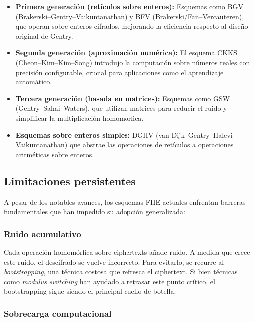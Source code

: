\documentclass[11pt]{article}
\theoremstyle{plain}
\begin{document}
\begin{itemize}
    \item \textbf{Primera generación (retículos sobre enteros):} Esquemas como BGV (Brakerski–Gentry–Vaikuntanathan) y BFV (Brakerski/Fan–Vercauteren), que operan sobre enteros cifrados, mejorando la eficiencia respecto al diseño original de Gentry.
    
    \item \textbf{Segunda generación (aproximación numérica):} El esquema CKKS (Cheon–Kim–Kim–Song) introdujo la computación sobre números reales con precisión configurable, crucial para aplicaciones como el aprendizaje automático.

    \item \textbf{Tercera generación (basada en matrices):} Esquemas como GSW (Gentry–Sahai–Waters), que utilizan matrices para reducir el ruido y simplificar la multiplicación homomórfica.

    \item \textbf{Esquemas sobre enteros simples:} DGHV (van Dijk–Gentry–Halevi–Vaikuntanathan) que abstrae las operaciones de retículos a operaciones aritméticas sobre enteros.
\end{itemize}

\subsection{Limitaciones persistentes}

A pesar de los notables avances, los esquemas FHE actuales enfrentan barreras fundamentales que han impedido su adopción generalizada:

\subsubsection{Ruido acumulativo}

Cada operación homomórfica sobre ciphertexts añade ruido. A medida que crece este ruido, el descifrado se vuelve incorrecto. Para evitarlo, se recurre al \textit{bootstrapping}, una técnica costosa que refresca el ciphertext. Si bien técnicas como \textit{modulus switching} han ayudado a retrasar este punto crítico, el bootstrapping sigue siendo el principal cuello de botella.

\subsubsection{Sobrecarga computacional}
\end{document}
